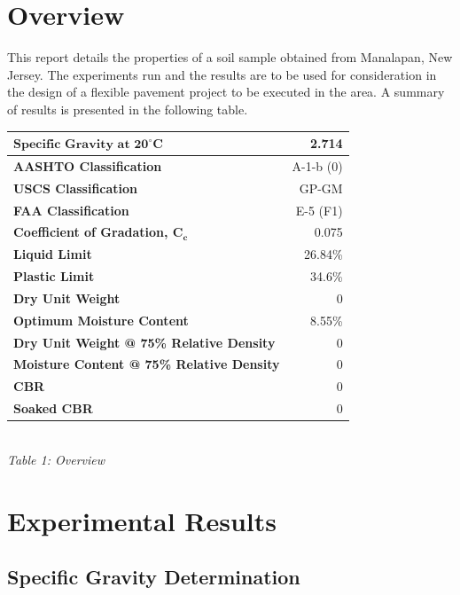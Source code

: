 \documentclass{article}
\begin{document}

\newpage
\doublespacing
\tableofcontents
\newpage
{}
\listoftables
{}
\listoffigures
\newpage
\section{Overview} 
\par This report details the properties of a soil sample obtained from Manalapan, New Jersey. The experiments run and the results are to be used for consideration in the design of a flexible pavement project to be executed in the area. A summary of results is presented in the following table. 
\begin{center}
\begin{tabular}{|l|r|}
    \hline 
    $\bm{\textbf{Specific Gravity at } 20^\circ\textbf{C}}$ & 2.714\\\hline
    \textbf{AASHTO Classification} & A-1-b (0)\\\hline 
    \textbf{USCS Classification} & GP-GM\\\hline 
    \textbf{FAA Classification} & E-5 (F1)\\\hline 
    \textbf{Coefficient of Gradation, $\bm{C_c}$} & 0.075\\\hline 
    \textbf{Liquid Limit} & 26.84\%\\\hline 
    \textbf{Plastic Limit} & 34.6\%\\\hline 
    \textbf{Dry Unit Weight} & 0\\\hline 
    \textbf{Optimum Moisture Content} & 8.55\%\\\hline 
    \textbf{Dry Unit Weight @ 75\% Relative Density} &0 \\\hline 
    \textbf{Moisture Content @ 75\% Relative Density} & 0\\\hline 
    \textbf{CBR} & 0\\\hline 
    \textbf{Soaked CBR} & 0\\\hline
\end{tabular}
\vspace{3mm}
\emph{\\Table 1: Overview}
\end{center}
\newpage
\section{Experimental Results}
\subsection{Specific Gravity Determination}
\end{document}
